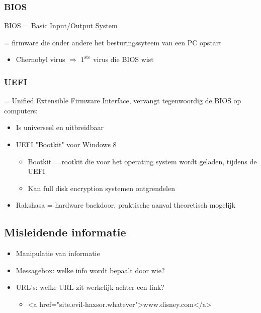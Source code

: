 \documentclass{article}
\begin{document}
\subsubsection{BIOS}

BIOS = Basic Input/Output System 

= firmware die onder andere het besturingssyteem van een PC opstart

\begin{itemize}
    \item Chernobyl virus $\Rightarrow$ $\text{1}^{\text{ste}}$ virus die BIOS wist
\end{itemize}

\subsubsection{UEFI}

= Unified Extensible Firmware Interface, vervangt tegenwoordig de BIOS op computers:

\begin{itemize}
    \item Is universeel en uitbreidbaar
    \item UEFI "Bootkit" voor Windows 8 
    \begin{itemize}
        \item Bootkit = rootkit die voor het operating system wordt geladen, tijdens de UEFI
        \item Kan full disk encryption systemen ontgrendelen
    \end{itemize}
    \item Rakshasa = hardware backdoor, praktische aanval theoretisch mogelijk
\end{itemize}

\subsection{Misleidende informatie}

\begin{itemize}
    \item Manipulatie van informatie
    \item Messagebox: welke info wordt bepaalt door wie?
    \item URL's: welke URL zit werkelijk achter een link?
    \begin{itemize}
        \item <a href="site.evil-haxsor.whatever">www.disney.com</a>
    \end{itemize}
\end{itemize}
\end{document}
